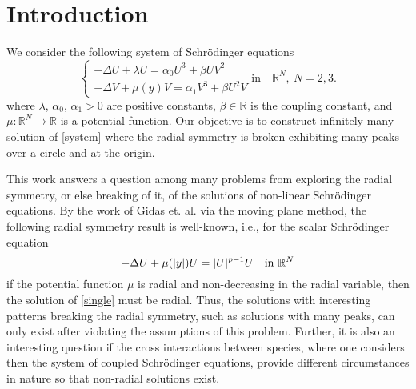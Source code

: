 \documentclass{amsart}
\theoremstyle{definition}
\theoremstyle{remark}
\numberwithin{equation}{section}
\begin{document}
\section{Introduction} \label{sec:intro}
 


We consider the following system of Schr\"odinger equations
\begin{equation}\left.\begin{cases}\label{system}
 -\Delta U + \lambda U = \alpha_0 U^3+ \beta UV^2\\
 -\Delta V + \mu(y) V = \alpha_1 V^3+\beta U^2V 
\end{cases}\right. \text{in} \quad \mathbb{R}^N, \ N=2,  3.\end{equation}
where  $\lambda$, $\alpha_0$, $\alpha_1>0$ are positive constants,    $\beta \in \mathbb{R}$ is the  coupling constant, and $\mu: \mathbb{R}^N \rightarrow \mathbb{R}$ is a potential function.  Our objective is to construct infinitely many solution of \eqref{system} where the radial symmetry is broken exhibiting many peaks over a circle and at the origin.

This work answers a question among many problems from exploring the radial symmetry, or else breaking of it, of the solutions of non-linear Schr\"odinger equations. By the work of  Gidas et. al. \cite{GNN} via the moving plane method, the following radial symmetry result is well-known, i.e., for the scalar Schr\"odinger equation
\begin{equation} \label{single}
 -\Delta U+ \mu(|y|) U = |U|^{p-1}U \quad \text{in $ \mathbb{R}^N$} %
\end{equation}
if the potential function $\mu$ is radial and non-decreasing in the radial variable, then the solution of \eqref{single} must be radial. Thus, the solutions with interesting patterns breaking the radial symmetry, such as solutions with many peaks, can only exist after violating the assumptions of this problem. Further, it is also an interesting question if the cross interactions between species, where one considers then the system of coupled Schr\"odinger equations, provide different circumstances in nature so that non-radial solutions exist.
\end{document}
